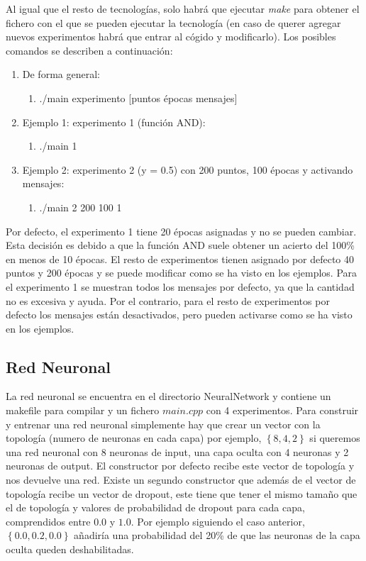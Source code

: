Al igual que el resto de tecnologías, solo habrá que ejecutar \textit{make} para obtener el fichero con el que se pueden ejecutar la tecnología (en caso de querer agregar nuevos experimentos habrá que entrar al cógido y modificarlo). Los posibles comandos se describen a continuación:

\begin{enumerate}
    \item De forma general:
    \begin{enumerate}
        \item ./main experimento [puntos épocas mensajes]
    \end{enumerate}
    \item Ejemplo 1: experimento 1 (función AND):
    \begin{enumerate}
        \item ./main 1
    \end{enumerate}
    \item Ejemplo 2: experimento 2 (y = 0.5) con 200 puntos, 100 épocas y activando mensajes:
    \begin{enumerate}
        \item ./main 2 200 100 1
    \end{enumerate}
\end{enumerate}

Por defecto, el experimento 1 tiene 20 épocas asignadas y no se pueden cambiar. Esta decisión es debido a que la función AND suele obtener un acierto del 100\% en menos de 10 épocas. El resto de experimentos tienen asignado por defecto 40 puntos y 200 épocas y se puede modificar como se ha visto en los ejemplos. Para el experimento 1 se muestran todos los mensajes por defecto, ya que la cantidad no es excesiva y ayuda. Por el contrario, para el resto de experimentos por defecto los mensajes están desactivados, pero pueden activarse como se ha visto en los ejemplos.

\newpage
\subsection{Red Neuronal}

La red neuronal se encuentra en el directorio NeuralNetwork y contiene un makefile para compilar y un fichero $main.cpp$ con 4 experimentos.  Para construir y entrenar una red neuronal simplemente hay que crear un vector con la topología (numero de neuronas en cada capa) por ejemplo, $\left \{8, 4, 2 \right \}$ si queremos una red neuronal con 8 neuronas de input, una capa oculta con 4 neuronas y 2 neuronas de output. El constructor por defecto recibe este vector de topología y nos devuelve una red. Existe un segundo constructor que además de el vector de topología recibe un vector de dropout, este tiene que tener el mismo tamaño que el de topología y valores de probabilidad de dropout para cada capa, comprendidos entre $0.0$ y $1.0$. Por ejemplo siguiendo el caso anterior, $\left \{0.0, 0.2, 0.0 \right \}$ añadiría una probabilidad del 20\% de que las neuronas de la capa oculta queden deshabilitadas.

